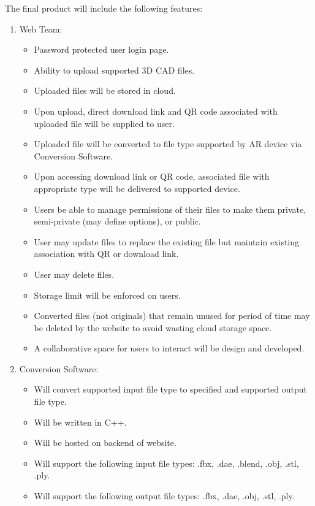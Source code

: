 % 




The final product will include the following features:

\begin{enumerate}
	\item Web Team:
	\begin{itemize}
		\item Password protected user login page. 
		\item Ability to upload supported 3D CAD files. 
		\item Uploaded files will be stored in cloud.
		\item Upon upload, direct download link and QR code associated with uploaded file will be supplied to user. 
		\item Uploaded file will be converted to file type supported by AR device via Conversion Software. 
		\item Upon accessing download link or QR code, associated file with appropriate type will be delivered to supported device. 
		\item Users be able to manage permissions of their files to make them private, semi-private (may define options), or public.
		\item User may update files to replace the existing file but maintain existing association with QR or download link.
		\item User may delete files. 
		\item Storage limit will be enforced on users. 
		\item Converted files (not originals) that remain unused for period of time may be deleted by the website to avoid wasting cloud storage space.  
		\item A collaborative space for users to interact will be design and developed. 
	\end{itemize}
	\item Conversion Software:
	\begin{itemize}
		\item Will convert supported input file type to specified and supported output file type. 
		\item Will be written in C++. 
		\item Will be hosted on backend of website. 
		\item Will support the following input file types: .fbx, .dae, .blend, .obj, .stl, .ply.
		\item Will support the following output file types: .fbx, .dae, .obj, .stl, .ply.
	\end{itemize} 
\end{enumerate}


